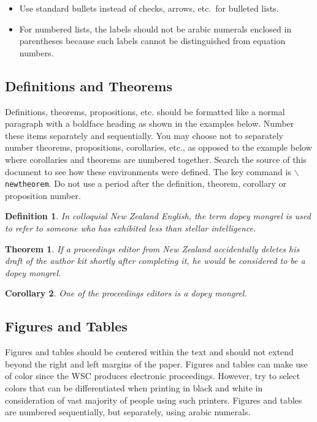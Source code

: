 \documentclass{wscpaperproc}
\theoremstyle{wsc}
\newtheorem{theorem}{Theorem}
\newtheorem{corollary}[theorem]{Corollary}
\newtheorem{definition}{Definition}
\begin{document}
\begin{itemize}
	\item Use standard bullets instead of checks, arrows, etc.\ for bulleted lists.
	\item For numbered lists, the labels should not be arabic numerals enclosed in parentheses because such labels cannot be distinguished from equation numbers.
\end{itemize}

\subsection{Definitions and Theorems}
Definitions, theorems, propositions, etc. should be formatted like a normal paragraph with a boldface heading as shown in the examples below. Number
these items separately and sequentially. You may choose not to separately number theorems, propositions, corollaries, etc., as opposed to the example below where corollaries and theorems are numbered together. Search the source of this document to see how these environments were defined. The key
command is {\tt $\backslash$newtheorem}. Do not use a period after the definition, theorem, corollary or proposition number.

\begin{definition}
In colloquial New Zealand English, the term {\em dopey mongrel} is used to refer to someone who has exhibited less than stellar intelligence.
\end{definition}

\begin{theorem}
If a proceedings editor from New Zealand accidentally deletes his draft of the author kit shortly after completing it, he would be considered to be a dopey mongrel.
\end{theorem}

\begin{corollary}
One of the proceedings editors is a dopey mongrel.
\end{corollary}

\subsection{Figures and Tables}
\label{sec:graphics}
Figures and tables should be centered within the text and should not extend beyond the right and left margins of the paper.
Figures and tables can make use of color since the WSC produces electronic proceedings.
However, try to select colors that can be differentiated when printing in black and white in consideration of vast majority of people using such printers.
Figures and tables are numbered sequentially, but separately, using arabic numerals.
\end{document}
